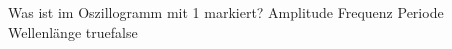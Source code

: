     {Was ist im Oszillogramm mit 1 markiert?}
    {Amplitude}
    {Frequenz}
    {Periode}
    {Wellenlänge}
    {true}{false}